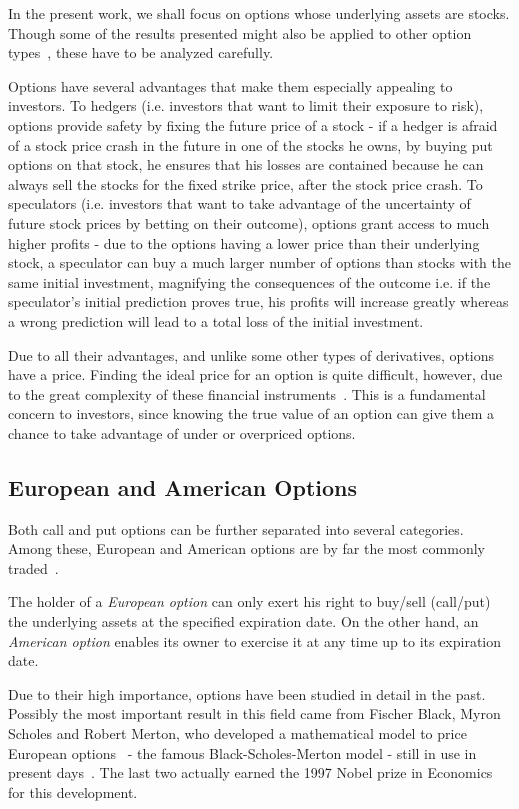 \documentclass[a4paper,twocolumn,aps,prd,longbibliography,superscriptaddress]{revtex4-1}
\begin{document}
In the present work, we shall focus on options whose underlying assets are stocks. Though some of the results presented might also be applied to other option types~\cite{Hull}, these have to be analyzed carefully.


Options have several advantages that make them especially appealing to investors.
To hedgers (i.e. investors that want to limit their exposure to risk), options provide safety by fixing the future price of a stock - if a hedger is afraid of a stock price crash in the future in one of the stocks he owns, by buying put options on that stock, he ensures that his losses are contained because he can always sell the stocks for the fixed strike price, after the stock price crash.
To speculators (i.e. investors that want to take advantage of the uncertainty of future stock prices by betting on their outcome), options grant access to much higher profits - due to the options having a lower price than their underlying stock, a speculator can buy a much larger number of options than stocks with the same initial investment, magnifying the consequences of the outcome i.e. if the speculator's initial prediction proves true, his profits will increase greatly whereas a wrong prediction will lead to a total loss of the initial investment.

Due to all their advantages, and unlike some other types of derivatives, options have a price. Finding the ideal price for an option is quite difficult, however, due to the great complexity of these financial instruments~\cite{Hull}. This is a fundamental concern to investors, since knowing the true value of an option can give them a chance to take advantage of under or overpriced options.




\subsection{European and American Options}
Both call and put options can be further separated into several categories. Among these, European and American options are by far the most commonly traded~\cite{Hull}.

The holder of a \textit{European option} can only exert his right to buy/sell (call/put) the underlying assets at the specified expiration date.
On the other hand, an \textit{American option} enables its owner to exercise it at any time up to its expiration date.



Due to their high importance, options have been studied in detail in the past.
Possibly the most important result in this field came from Fischer Black, Myron Scholes and Robert Merton, who developed a mathematical model to price European options~\cite{Scholes} - the famous Black-Scholes-Merton model - still in use in present days~\cite{Hull}. The last two actually earned the 1997 Nobel prize in Economics for this development.
\end{document}
